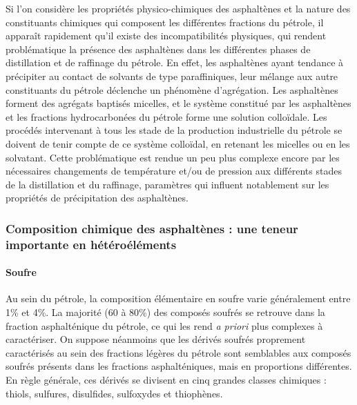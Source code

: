 Si l'on considère les propriétés physico-chimiques des asphaltènes et la nature des constituants chimiques qui composent les différentes fractions du pétrole, il apparaît rapidement qu'il existe des incompatibilités physiques, qui rendent problématique la présence des asphaltènes dans les différentes phases de distillation et de raffinage du pétrole. En effet, les asphaltènes ayant tendance à précipiter au contact de solvants de type paraffiniques, leur mélange aux autre constituants du pétrole déclenche un phénomène d'agrégation. Les asphaltènes forment des agrégats baptisés micelles, et le système constitué par les asphaltènes et les fractions hydrocarbonées du pétrole forme une solution colloïdale. Les procédés intervenant à tous les stade de la production industrielle du pétrole se doivent de tenir compte de ce système colloïdal, en retenant les micelles ou en les solvatant. Cette problématique est rendue un peu plus complexe encore par les nécessaires changements de température et/ou de pression aux différents stades de la distillation et du raffinage, paramètres qui influent notablement sur les propriétés de précipitation des asphaltènes. 

\subsubsection{Composition chimique des asphaltènes : une teneur importante en hétéroéléments}

\paragraph{Soufre}

Au sein du pétrole, la composition élémentaire en soufre varie généralement entre 1\% et 4\%. La majorité (60 à 80\%) des composés soufrés se retrouve dans la fraction asphalténique du pétrole, ce qui les rend \textit{a priori} plus complexes à caractériser. On suppose néanmoins que les dérivés soufrés proprement caractérisés au sein des fractions légères du pétrole sont semblables aux composés soufrés présents dans les fractions asphalténiques, mais en proportions différentes. 
En règle générale, ces dérivés se divisent en cinq grandes classes chimiques : thiols, sulfures, disulfides, sulfoxydes et thiophènes. 


